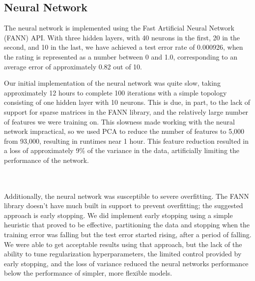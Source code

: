 \documentclass[journal]{IEEEtran}
\begin{document}
\subsection{Neural Network}
The neural network is implemented using the Fast Artificial Neural Network (FANN)
API.  With three hidden layers, with 40 neurons in the first, 20 in the second, and 10 in the last,
we have achieved a test error rate of 0.000926, when the rating is represented as a
number between 0 and 1.0, corresponding to an average error of approximately 0.82 out of 10.
\\
\par Our initial implementation of the neural network was quite slow, taking approximately
12 hours to complete 100 iterations with a simple topology consisting of one hidden
layer with 10 neurons.  This is due, in part, to the lack of support for sparse matrices in the FANN library, and the relatively large number of features we were training on.  This slowness made working with the neural network impractical, so we used PCA to reduce the number of features to 5,000 from 93,000, resulting in runtimes near 1 hour.  This feature reduction resulted in a loss of approximately 9\% of the variance in the data, artificially limiting the performance of the network.  \\
\\
\\
\par Additionally, the neural network was susceptible to severe overfitting.  The FANN library doesn't have much built in support to prevent overfitting; the suggested approach is early stopping.  We did implement early stopping using a simple heuristic that proved to be effective, partitioning the data and stopping when the training error was falling but the test error started rising, after a period of falling.  We were able to get acceptable results using that approach, but the lack of the ability to tune regularization hyperparameters, the limited control provided by early stopping, and the loss of variance reduced the neural networks performance below the performance of simpler, more flexible models.
\end{document}
